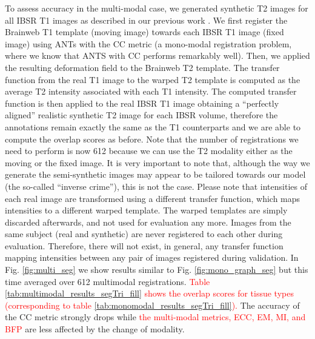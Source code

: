 To assess accuracy in the multi-modal case, we generated synthetic T2 images for all IBSR T1 images as described in our previous work \cite{Ocegueda2015}. We first register the Brainweb T1 template (moving image) towards each IBSR T1 image (fixed image) using ANTs with the CC metric (a mono-modal registration problem, where we know that ANTS with CC performs remarkably well). Then, we applied the resulting deformation field to the Brainweb T2 template. The transfer function from the real T1 image to the warped T2 template is computed as the average T2 intensity associated with each T1 intensity. The computed transfer function is then applied to the real IBSR T1 image obtaining a ``perfectly aligned'' realistic synthetic T2 image for each IBSR volume, therefore the annotations remain exactly the same as the T1 counterparts and we are able to compute the overlap scores as before. Note that the number of registrations we need to perform is now 612 because we can use the T2 modality either as the moving or the fixed image. It is very important to note that, although the way we generate the semi-synthetic images may appear to be tailored towards our model (the so-called ``inverse crime''), this is not the case. Please note that intensities of each real image are transformed using a different transfer function, which maps intensities to a different warped template. The warped templates are simply discarded afterwards, and not used for evaluation any more. Images from the same subject (real and synthetic) are never registered to each other during evaluation. Therefore, there will not exist, in general, any transfer function mapping intensities between any pair of images registered during validation. In Fig. \ref{fig:multi_seg} we show results similar to Fig. \ref{fig:mono_graph_seg} but this time averaged over 612 multimodal registrations. \textcolor{red}{ Table \ref{tab:multimodal_results_segTri_fill} shows the overlap scores for tissue types (corresponding to table \ref{tab:monomodal_results_segTri_fill}).} The accuracy of the CC metric strongly drops while \textcolor{red}{ the multi-modal metrics, ECC, EM, MI, and BFP} are less affected by the change of modality.\\



